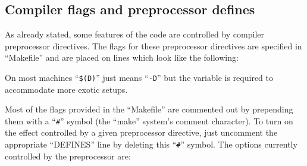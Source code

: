 \subsection{Compiler flags and preprocessor defines}
\label{sec:makefile}
As already stated, some features of the code are controlled by compiler
preprocessor directives. The flags for these preprocessor directives are
specified in ``Makefile'' and are placed on lines which look like the
following:
On most machines ``\texttt{\$(D)}'' just means ``\texttt{-D}'' but the variable
is required to accommodate more exotic setups.

Most of the flags provided in the ``Makefile'' are commented out by prepending
them with a ``\verb|#|'' symbol (the ``make'' system's comment character).
To turn on the effect controlled by a given preprocessor directive, just
uncomment the appropriate ``DEFINES'' line by deleting this ``\verb|#|''
symbol. The options currently controlled by the preprocessor are:\\
